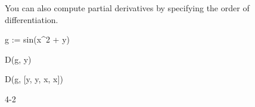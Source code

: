 {{{{{{{{\begin{xtc}
\begin{xtccomment}
You can also compute partial derivatives by specifying the order of
differentiation.
\end{xtccomment}
\begin{spadsrc}
g := sin(x^2 + y) 
\end{spadsrc}
\begin{TeXOutput}
\begin{fricasmath}{4}
%
\end{fricasmath}
\end{TeXOutput}
\end{xtc}
\begin{xtc}
\begin{xtccomment}
\end{xtccomment}
\begin{spadsrc}
D(g, y) 
\end{spadsrc}
\begin{TeXOutput}
\begin{fricasmath}{5}
%
\end{fricasmath}
\end{TeXOutput}
\end{xtc}
\begin{xtc}
\begin{xtccomment}
\end{xtccomment}
\begin{spadsrc}
D(g, [y, y, x, x]) 
\end{spadsrc}
\begin{TeXOutput}
\begin{fricasmath}{6}
4\TIMES {}\TIMES {}-{2\TIMES {}}%
\end{fricasmath}
\end{TeXOutput}
\end{xtc}

}}}}}}}}
